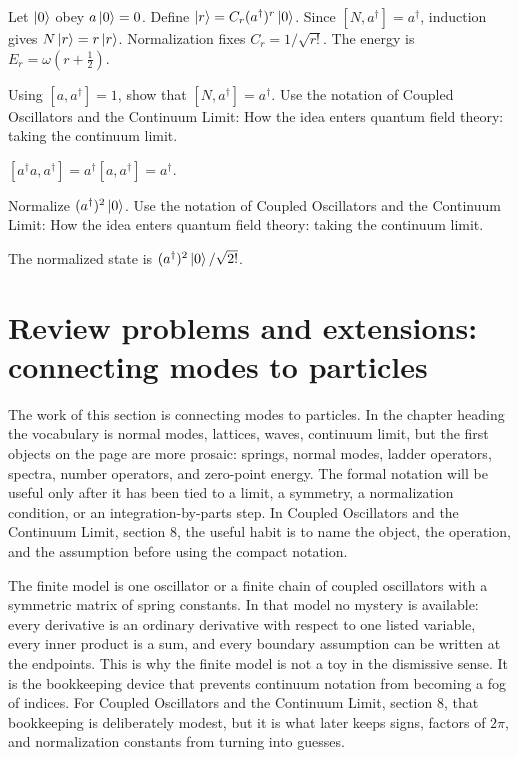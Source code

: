 \begin{example}
Let \(\left|0\right\rangle\) obey \(a\left|0\right\rangle=0\).  Define \(\left|r\right\rangle=C_r(a^\dagger)^r\left|0\right\rangle\).  Since \([N,a^\dagger]=a^\dagger\), induction gives \(N\left|r\right\rangle=r\left|r\right\rangle\).  Normalization fixes \(C_r=1/\sqrt{r!}\).  The energy is \(E_r=\omega(r+\frac12)\).
\end{example}



\begin{exercise}
Using \([a,a^\dagger]=1\), show that \([N,a^\dagger]=a^\dagger\).  Use the notation of Coupled Oscillators and the Continuum Limit: How the idea enters quantum field theory: taking the continuum limit.
\begin{answer}
\([a^\dagger a,a^\dagger]=a^\dagger[a,a^\dagger]=a^\dagger\).
\end{answer}
\end{exercise}

\begin{exercise}
Normalize \((a^\dagger)^2\left|0\right\rangle\).  Use the notation of Coupled Oscillators and the Continuum Limit: How the idea enters quantum field theory: taking the continuum limit.
\begin{answer}
The normalized state is \((a^\dagger)^2\left|0\right\rangle/\sqrt{2!}\).
\end{answer}
\end{exercise}



\section{Review problems and extensions: connecting modes to particles}

The work of this section is connecting modes to particles.  In the chapter heading the vocabulary is normal modes, lattices, waves, continuum limit, but the first objects on the page are more prosaic: springs, normal modes, ladder operators, spectra, number operators, and zero-point energy.  The formal notation will be useful only after it has been tied to a limit, a symmetry, a normalization condition, or an integration-by-parts step.  In Coupled Oscillators and the Continuum Limit, section 8, the useful habit is to name the object, the operation, and the assumption before using the compact notation.

The finite model is one oscillator or a finite chain of coupled oscillators with a symmetric matrix of spring constants.  In that model no mystery is available: every derivative is an ordinary derivative with respect to one listed variable, every inner product is a sum, and every boundary assumption can be written at the endpoints.  This is why the finite model is not a toy in the dismissive sense.  It is the bookkeeping device that prevents continuum notation from becoming a fog of indices.  For Coupled Oscillators and the Continuum Limit, section 8, that bookkeeping is deliberately modest, but it is what later keeps signs, factors of \(2\pi\), and normalization constants from turning into guesses.

